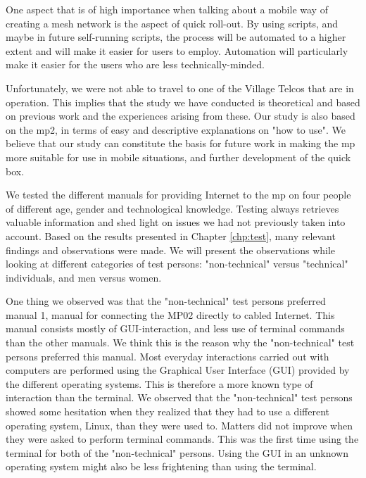 One aspect that is of high importance when talking about a mobile way of creating a mesh network is the aspect of quick roll-out. By using scripts, and maybe in future self-running scripts, the process will be automated to a higher extent and will make it easier for users to employ. Automation will particularly make it easier for the users who are less technically-minded. 

Unfortunately, we were not able to travel to one of the Village Telcos that are in operation. This implies that the study we have conducted is theoretical and based on previous work and the experiences arising from these. Our study is also based on the \gls{mp2}, in terms of easy and descriptive explanations on "how to use". We believe that our study can constitute the basis for future work in making the \gls{mp} more suitable for use in mobile situations, and further development of the \gls{quick} box. 

We tested the different manuals for providing Internet to the \gls{mp} on four people of different age, gender and technological knowledge. Testing always retrieves valuable information and shed light on issues we had not previously taken into account. Based on the results presented in Chapter \ref{chp:test}, many relevant findings and observations were made. We will present the observations while looking at different categories of test persons: "non-technical" versus "technical" individuals, and men versus women. 

One thing we observed was that the "non-technical" test persons preferred manual 1, manual for connecting the MP02 directly to cabled Internet. This manual consists mostly of GUI-interaction, and less use of terminal commands than the other manuals. We think this is the reason why the "non-technical" test persons preferred this manual. Most everyday interactions carried out with computers are performed using the Graphical User Interface (GUI) provided by the different operating systems.  This is therefore a more known type of interaction than the terminal. We observed that the "non-technical" test persons showed some hesitation when they realized that they had to use a different operating system, Linux, than they were used to. Matters did not improve when they were asked to perform terminal commands. This was the first time using the terminal for both of the "non-technical" persons. Using the GUI in an unknown operating system might also be less frightening than using the terminal. 

